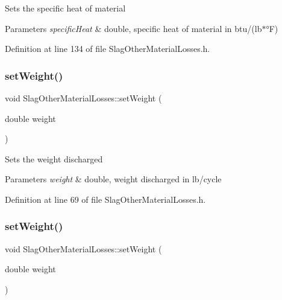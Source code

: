 Sets the specific heat of material 
\begin{DoxyParams}{Parameters}
{\em specific\+Heat} & double, specific heat of material in btu/(lb$\ast$°F) \\
\hline
\end{DoxyParams}


Definition at line 134 of file Slag\+Other\+Material\+Losses.\+h.

\mbox{\label{class_slag_other_material_losses_a230a178f2ead59cd498b620e4bb4910f}} 
\subsubsection{\texorpdfstring{set\+Weight()}{setWeight()}\hspace{0.1cm}{\footnotesize\ttfamily [1/3]}}
{\footnotesize\ttfamily void Slag\+Other\+Material\+Losses\+::set\+Weight (\begin{DoxyParamCaption}\item[{double}]{weight }\end{DoxyParamCaption})\hspace{0.3cm}{\ttfamily [inline]}}

Sets the weight discharged 
\begin{DoxyParams}{Parameters}
{\em weight} & double, weight discharged in lb/cycle \\
\hline
\end{DoxyParams}


Definition at line 69 of file Slag\+Other\+Material\+Losses.\+h.

\mbox{\label{class_slag_other_material_losses_a230a178f2ead59cd498b620e4bb4910f}} 
\subsubsection{\texorpdfstring{set\+Weight()}{setWeight()}\hspace{0.1cm}{\footnotesize\ttfamily [2/3]}}
{\footnotesize\ttfamily void Slag\+Other\+Material\+Losses\+::set\+Weight (\begin{DoxyParamCaption}\item[{double}]{weight }\end{DoxyParamCaption})\hspace{0.3cm}{\ttfamily [inline]}}

